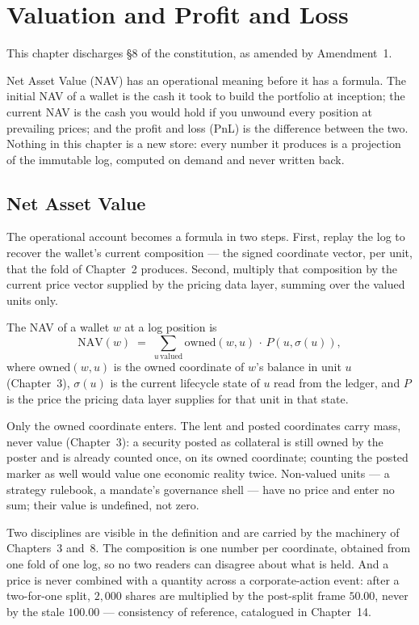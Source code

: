 \section{Valuation and Profit and Loss}\label{ch:valuation}

This chapter discharges §8 of the constitution, as amended by Amendment~1.

Net Asset Value (NAV) has an operational meaning before it has a formula.
The initial NAV of a wallet is the cash it took to build the portfolio at
inception; the current NAV is the cash you would hold if you unwound every
position at prevailing prices; and the profit and loss (PnL) is the
difference between the two. Nothing in this chapter is a new store: every
number it produces is a projection of the immutable log, computed on demand
and never written back.

\subsection{Net Asset Value}

The operational account becomes a formula in two steps. First, replay the log
to recover the wallet's current composition --- the signed coordinate vector,
per unit, that the fold of Chapter~2 produces. Second, multiply that
composition by the current price vector supplied by the pricing data layer,
summing over the valued units only.

\begin{definition}
The NAV of a wallet $w$ at a log position is
\[
  \mathrm{NAV}(w) \;=\; \sum_{u \,\text{valued}} \mathrm{owned}(w,u)\,\cdot\, P\!\left(u, \sigma(u)\right),
\]
where $\mathrm{owned}(w,u)$ is the owned coordinate of $w$'s balance in unit
$u$ (Chapter~3), $\sigma(u)$ is the current lifecycle state of $u$ read from
the ledger, and $P$ is the price the pricing data layer supplies for that unit
in that state.
\end{definition}

Only the owned coordinate enters. The lent and posted coordinates carry mass,
never value (Chapter~3): a security posted as collateral is still owned by the
poster and is already counted once, on its owned coordinate; counting the
posted marker as well would value one economic reality twice. Non-valued units
--- a strategy rulebook, a mandate's governance shell --- have no price and
enter no sum; their value is undefined, not zero.

Two disciplines are visible in the definition and are carried by the machinery
of Chapters~3 and~8. The composition is one number per coordinate, obtained
from one fold of one log, so no two readers can disagree about what is held.
And a price is never combined with a quantity across a corporate-action event:
after a two-for-one split, $2{,}000$ shares are multiplied by the post-split
frame $50.00$, never by the stale $100.00$ --- consistency of reference,
catalogued in Chapter~14.

